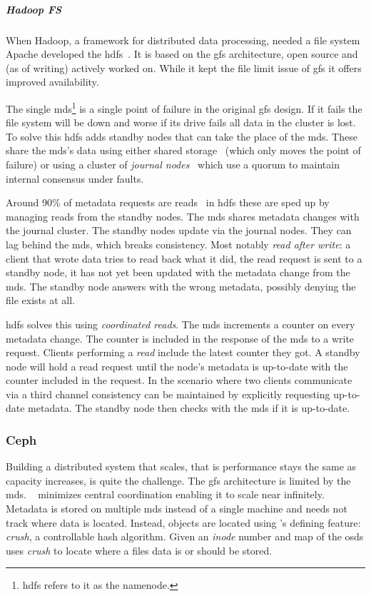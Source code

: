 \subparagraph*{Hadoop FS} \label{sec:hdfs}
When Hadoop, a framework for distributed data processing, needed a file system Apache developed the \ac{hdfs}~\cite{hdfs}. It is based on the \ac{gfs} architecture, open source and (as of writing) actively worked on. While it kept the file limit issue of \ac{gfs} it offers improved availability.

The single \ac{mds}\footnote{\ac{hdfs} refers to it as the namenode.} is a single point of failure in the original \ac{gfs} design. If it fails the file system will be down and worse if its drive fails all data in the cluster is lost. To solve this \ac{hdfs} adds standby nodes that can take the place of the \ac{mds}. These share the \ac{mds}'s data using either shared storage~\cite{hdfs_ha_nfs} (which only moves the point of failure) or using a cluster of \textit{journal nodes}~\cite{hdfs_ha_q} which use a quorum to maintain internal consensus under faults. 

Around 90\% of metadata requests are reads~\cite{hdfs_ha_reads} in \ac{hdfs} these are sped up by managing reads from the standby nodes. The \ac{mds} shares metadata changes with the journal cluster. The standby nodes update via the journal nodes. They can lag behind the \ac{mds}, which breaks consistency. Most notably \textit{read after write}: a client that wrote data tries to read back what it did, the read request is sent to a standby node, it has not yet been updated with the metadata change from the \ac{mds}. The standby node answers with the wrong metadata, possibly denying the file exists at all. 

\ac{hdfs} solves this using \textit{coordinated reads}. The \ac{mds} increments a counter on every metadata change. The counter is included in the response of the \ac{mds} to a write request. Clients performing a \textit{read} include the latest counter they got. A standby node will hold a read request until the node's metadata is up-to-date with the counter included in the request. In the scenario where two clients communicate via a third channel consistency can be maintained by explicitly requesting up-to-date metadata. The standby node then checks with the \ac{mds} if it is up-to-date.

\subsubsection*{Ceph} \label{sec:ceph}
Building a distributed system that scales, that is performance stays the same as capacity increases, is quite the challenge. The \ac{gfs} architecture is limited by the \acf{mds}. \ceph{}~\cite{ceph} minimizes central coordination enabling it to scale near infinitely. Metadata is stored on multiple \ac{mds} instead of a single machine and needs not track where data is located. Instead, objects are located using \ceph{}'s defining feature: \emph{\ac{crush}}, a controllable hash algorithm. Given an \textit{inode} number and map of the \acp{osd} \ceph{} uses \emph{\ac{crush}} to locate where a files data is or should be stored. 

